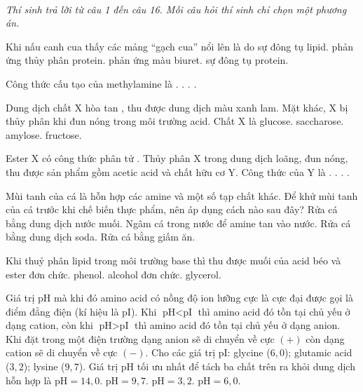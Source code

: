 \documentclass[11pt,a4paper]{article}
\begin{document}
 \\
\textit{Thí sinh trả lời từ câu 1 đến câu 16. Mỗi câu hỏi thí sinh chỉ chọn một phương án.}
\vspace{4pt}
\begin{ex}
Khi nấu canh cua thấy các mảng ``gạch cua'' nổi lên là do
\choice
{sự đông tụ lipid.}
{phản ứng thủy phân protein.}
{phản ứng màu biuret.}
{sự đông tụ protein.}
\loigiai{}
\end{ex}
\begin{ex}
Công thức cấu tạo của methylamine là
\choice
{.}
{.}
{.}
{.}
\loigiai{}
\end{ex}
\begin{ex}
Dung dịch chất X hòa tan , thu được dung dịch màu xanh lam. Mặt khác, X bị thủy phân khi đun nóng trong môi trường acid. Chất X là
\choice
{glucose.}
{saccharose.}
{amylose.}
{fructose.}
\loigiai{}
\end{ex}
\begin{ex}
Ester X có công thức phân tử . Thủy phân X trong dung dịch  loãng, đun nóng, thu được sản phẩm gồm acetic acid và chất hữu cơ Y. Công thức của Y là
\choice
{.}
{.}
{.}
{.}
\loigiai{}
\end{ex}
\begin{ex}
Mùi tanh của cá là hỗn hợp các amine và một số tạp chất khác. Để khử mùi tanh của cá trước khi chế biến thực phẩm, nên áp dụng cách nào sau đây?
\choice
{Rửa cá bằng dung dịch nước muối.}
{Ngâm cá trong nước để amine tan vào nước.}
{Rửa cá bằng dung dịch soda.}
{Rửa cá bằng giấm ăn.}
\loigiai{}
\end{ex}
\begin{ex}
Khi thuỷ phân lipid trong môi trường base thì thu được muối của acid béo và
\choice
{ester đơn chức.}
{phenol.}
{alcohol đơn chức.}
{glycerol.}
\loigiai{}
\end{ex}
\begin{ex}
Giá trị pH mà khi đó amino acid có nồng độ ion lưỡng cực là cực đại được gọi là điểm đẳng điện (kí hiệu là pI). Khi $\text{pH} < \text{pI}$ thì amino acid đó tồn tại chủ yếu ở dạng cation, còn khi $\text{pH} > \text{pI}$ thì amino acid đó tồn tại chủ yếu ở dạng anion. Khi đặt trong một điện trường dạng anion sẽ di chuyển về cực $(+)$ còn dạng cation sẽ di chuyển về cực $(-)$. Cho các giá trị pI: glycine ($6{,}0$); glutamic acid ($3{,}2$); lysine ($9{,}7$). Giá trị pH tối ưu nhất để tách ba chất trên ra khỏi dung dịch hỗn hợp là
\choice
{$\text{pH} = 14{,}0$.}
{$\text{pH} = 9{,}7$.}
{$\text{pH} = 3{,}2$.}
{$\text{pH} = 6{,}0$.}
\loigiai{}
\end{ex}
\end{document}
